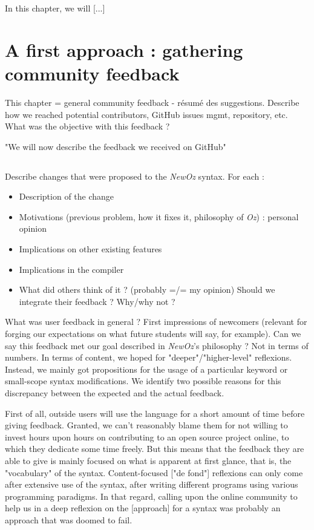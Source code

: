 
In this chapter, we will [...]

\section{A first approach : gathering community feedback}\label{sec:ch4-GitHub}
This chapter = general community feedback - résumé des suggestions.\newline
Describe how we reached potential contributors, GitHub issues mgmt, repository, etc.
What was the objective with this feedback ?

"We will now describe the feedback we received on GitHub"
\subsection{}
Describe changes that were proposed to the \textit{NewOz} syntax.
For each :
\begin{itemize}
    \item Description of the change
    \item Motivations (previous problem, how it fixes it, philosophy of \textit{Oz}) : personal opinion
    \item Implications on other existing features
    \item Implications in the compiler
    \item What did others think of it ? (probably =/= my opinion) Should we integrate their feedback ? Why/why not ?
\end{itemize}

What was user feedback in general ?
First impressions of newcomers (relevant for forging our expectations on what future students will say, for example).\newline
Can we say this feedback met our goal described in \textit{NewOz}'s philosophy ?
Not in terms of numbers.
In terms of content, we hoped for "deeper"/"higher-level" reflexions.
Instead, we mainly got propositions for the usage of a particular keyword or small-scope syntax modifications.\newline
We identify two possible reasons for this discrepancy between the expected and the actual feedback.\newline

First of all, outside users will use the language for a short amount of time before giving feedback.
Granted, we can't reasonably blame them for not willing to invest hours upon hours on contributing to an open source project online, to which they dedicate some time freely.
But this means that the feedback they are able to give is mainly focused on what is apparent at first glance, that is, the "vocabulary" of the syntax.
Content-focused ["de fond"] reflexions can only come after extensive use of the syntax, after writing different programs using various programming paradigms.
In that regard, calling upon the online community to help us in a deep reflexion on the [approach] for a syntax was probably an approach that was doomed to fail.\newline

